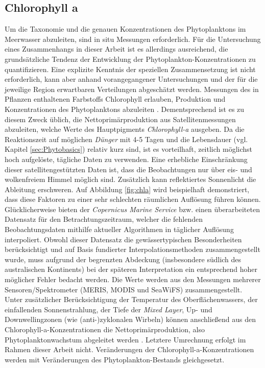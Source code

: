 \documentclass[12pt,a4paper,onecolumn]{scrartcl}
\begin{document}
\subsection{Chlorophyll a} \label{sec:chla}
Um die Taxonomie und die genauen Konzentrationen des Phytoplanktons im Meerwasser abzuleiten, sind in situ Messungen erforderlich. Für die Untersuchung eines Zusammenhangs in dieser Arbeit ist es allerdings ausreichend, die grundsätzliche Tendenz der Entwicklung der Phytoplankton-Konzentrationen zu quantifizieren. Eine explizite Kenntnis der speziellen Zusammensetzung ist nicht erforderlich, kann aber anhand vorangegangener Untersuchungen und der für die jeweilige Region erwartbaren Verteilungen abgeschätzt werden. Messungen des in Pflanzen enthaltenen Farbstoffs Chlorophyll erlauben, Produktion und Konzentrationen des Phytoplanktons abzuleiten \citep{RYTHER.1957}. Dementsprechend ist es zu diesem Zweck üblich, die Nettoprimärproduktion aus Satellitenmessungen abzuleiten, welche Werte des Hauptpigments \textit{Chlorophyll-a} ausgeben. Da die Reaktionszeit auf möglichen \textit{Dünger} mit 4-5 Tagen und die Lebensdauer (vgl. Kapitel \ref{sec:Phytobasics}) relativ kurz sind, ist es vorteilhaft, zeitlich möglichst hoch aufgelöste, tägliche Daten zu verwenden. Eine erhebliche Einschränkung dieser satellitengestützten Daten ist, dass die Beobachtungen nur über eis- und wolkenfreiem Himmel möglich sind. Zusätzlich kann reflektiertes Sonnenlicht die Ableitung erschweren. Auf Abbildung \ref{fig:chla} wird beispielhaft demonstriert, dass diese Faktoren zu einer sehr schlechten räumlichen Auflösung führen können. Glücklicherweise bieten der \textit{Copernicus Marine Service} bzw. \citet{Saulquin.2019} einen überarbeiteten Datensatz für den Betrachtungszeitraum, welcher die fehlenden Beobachtungsdaten mithilfe aktueller Algorithmen in täglicher Auflösung interpoliert. Obwohl dieser Datensatz die gewässertypischen Besonderheiten berücksichtigt und auf Basis fundierter Interpolationsmethoden zusammengestellt wurde, muss aufgrund der begrenzten Abdeckung (insbesondere südlich des australischen Kontinents) bei der späteren Interpretation ein entsprechend hoher möglicher Fehler bedacht werden. Die Werte werden aus den Messungen mehrerer Sensoren/Spektrometer (MERIS, MODIS und SeaWiFS) zusammengestellt. Unter zusätzlicher Berücksichtigung der Temperatur des Oberflächenwassers, der einfallenden Sonnenstrahlung, der Tiefe der \textit{Mixed Layer}, Up- und Downwellingzonen (wie (anti-)zyklonalen Wirbeln) können anschließend aus den Chlorophyll-a-Konzentrationen die Nettoprimärproduktion, also Phytoplanktonwachstum abgeleitet werden \citep{Falkowski.1998}. Letztere Umrechnung erfolgt im Rahmen dieser Arbeit nicht. Veränderungen der Chlorophyll-a-Konzentrationen werden mit Veränderungen des Phytoplankton-Bestands gleichgesetzt.
\end{document}
